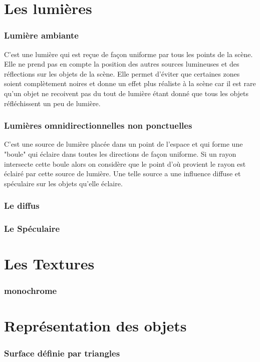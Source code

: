 \documentclass[fontsize=10pt, twoside=no]{scrartcl} %
\begin{document}
\part{Les lumières}

    \section{Lumière ambiante}

C'est une lumière qui est reçue de façon uniforme par tous les points de la scène. Elle ne prend pas en compte la
position des autres sources lumineuses et des réflections sur les objets de la scène. Elle permet d'éviter que certaines
zones soient complètement noires et donne un effet plus réaliste à la scène car il est rare qu'un objet ne recoivent pas
du tout de lumière étant donné que tous les objets réfléchissent un peu de lumière.

    \section{Lumières omnidirectionnelles non ponctuelles}

C'est une source de lumière placée dans un point de l'espace et qui forme une "boule" qui éclaire dans toutes les
directions de façon uniforme. Si un rayon intersecte cette boule alors on considère que le point d'où provient le rayon
est éclairé par cette source de lumière. Une telle source a une influence diffuse et spéculaire sur les objets qu'elle
éclaire.

    \section{Le diffus}

    \section{Le Spéculaire}

\part{Les Textures}

    \section{monochrome}

\part{Représentation des objets}

    \section{Surface définie par triangles}
    
\end{document}
